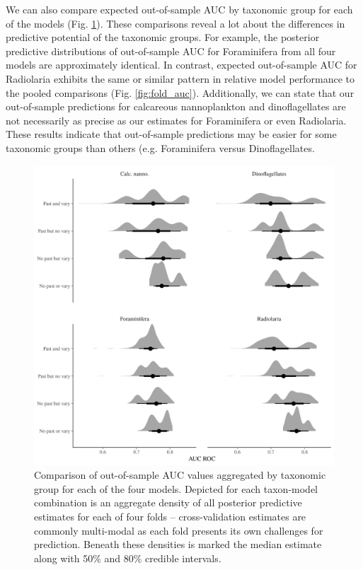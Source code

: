 \documentclass[12pt,letterpaper]{article}
\begin{document}
We can also compare expected out-of-sample AUC by taxonomic group for each of the models (Fig. \ref{fig:fold_auc_taxon}). These comparisons reveal a lot about the differences in predictive potential of the taxonomic groups. For example, the posterior predictive distributions of out-of-sample AUC for Foraminifera from all four models are approximately identical. In contrast, expected out-of-sample AUC for Radiolaria exhibits the same or similar pattern in relative model performance to the pooled comparisons (Fig. \ref{fig:fold_auc}). Additionally, we can state that our out-of-sample predictions for calcareous nannoplankton and dinoflagellates are not necessarily as precise as our estimates for Foraminifera or even Radiolaria. These results indicate that out-of-sample predictions may be easier for some taxonomic groups than others (e.g. Foraminifera versus Dinoflagellates.
\begin{figure}[ht]
  \centering
  \includegraphics[width=\textwidth,height=0.5\textheight,keepaspectratio=true]{../results/figure/fold_auc_taxon}
  \caption{Comparison of out-of-sample AUC values aggregated by taxonomic group for each of the four models. Depicted for each taxon-model combination is an aggregate density of all posterior predictive estimates for each of four folds -- cross-validation estimates are commonly multi-modal as each fold presents its own challenges for prediction. Beneath these densities is marked the median estimate along with 50\% and 80\% credible intervals.}
  \label{fig:fold_auc_taxon}
\end{figure}
\end{document}
